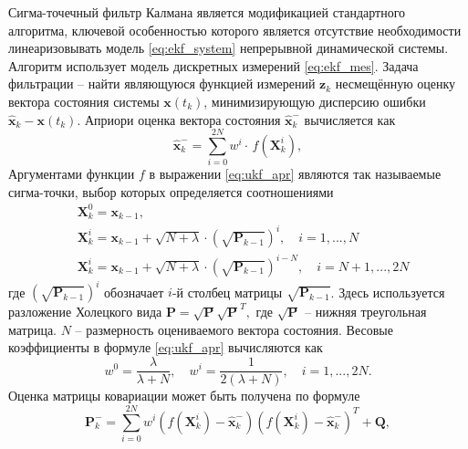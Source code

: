 Сигма-точечный фильтр Калмана является модификацией стандартного алгоритма, ключевой особенностью которого является отсутствие необходимости линеаризовывать модель \eqref{eq:ekf_system} непрерывной динамической системы. Алгоритм использует модель дискретных измерений \eqref{eq:ekf_mes}.
Задача фильтрации -- найти являющуюся функцией измерений $\bm z_k$ несмещённую оценку вектора состояния системы  $\bm x(t_k)$, минимизирующую дисперсию ошибки  ${\hat{\bm{x}}_k} - \bm x({t_k})$.
Априори оценка вектора состояния $\bm{\hat x}_k^-$ вычисляется как
\begin{equation} \label{eq:ukf_apr}
{\bm{\hat x}}_k^-  = \sum\limits_{i = 0}^{2N} {{w^i} \cdot } \,f\left( {{\bm{X}}_k^i} \right),
\end{equation}
Аргументами функции $f$ в выражении \eqref{eq:ukf_apr} являются так называемые сигма-точки, выбор которых определяется соотношениями
\begin{equation} \label{eq:ukf_points}
\begin{aligned}
&{{\bm{X}}_k^0 = {{\bm{x}}_{k - 1}}},
\\
&{{\bm{X}}_k^i = {{\bm{x}}_{k - 1}} + \sqrt {N + {{\lambda }}}  \cdot {{\left( {\sqrt {{{\bm{P}}_{k - 1}}} } \right)}^i}}, \quad {i = 1,...,N}
\\
&{{\bm{X}}_k^i = {{\bm{x}}_{k - 1}} + \sqrt {N + {{\lambda }}}  \cdot {{\left( {\sqrt {{{\bm{P}}_{k - 1}}} } \right)}^{i - N}}}, \quad {i = N + 1,...,2N}
\end{aligned}
\end{equation}
где
${{{\left( {\sqrt {{{\bm{P}}_{k - 1}}} } \right)}^i}}$
обозначает  $i$-й столбец матрицы ${\sqrt {{{\bm{P}}_{k - 1}}} }$.  Здесь используется разложение Холецкого \cite{Verbjitsky01} вида
${\bm{P}} = \sqrt {\bm{P}} {\sqrt {\bm{P}} ^T},$
где $\sqrt {\bm{P}}$ -- нижняя треугольная матрица. $N$ -- размерность оцениваемого вектора состояния. Весовые коэффициенты в формуле \eqref{eq:ukf_apr} вычисляются как
\begin{equation}
{w^0} = \frac{{{\lambda }}}{{{{\lambda }} + N}},
\quad
{w^i} = \frac{1}{{2\left( {{{\lambda }} + N} \right)}},
\quad
i = 1,...,2N.
\end{equation}
Оценка матрицы ковариации может быть получена по формуле
\begin{equation} \label{eq:ukf_p_apr}
{\bm{P}}_k^ -  = \sum\limits_{i = 0}^{2N} {{w^i}\left( {f\left( {{\bm{X}}_k^i} \right) - {\bm{\hat x}}_k^ - } \right)} {\left( {f\left( {{\bm{X}}_k^i} \right) - {\bm{\hat x}}_k^ - } \right)^{{T}}} + {\bm{Q}},
\end{equation}

